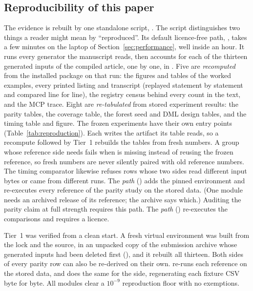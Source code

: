 \subsection{Reproducibility of this paper}\label{sec:reproducibility}

The evidence is rebuilt by one standalone script,
. The script distinguishes two
things a reader might mean by ``reproduced''. Its default licence-free
path, , takes a few minutes on the laptop of
Section~\ref{sec:performance}, well inside an hour. It
runs every generator the manuscript reads, then accounts for each of the
thirteen generated inputs of the compiled article, one by one, in
.
Five are \emph{recomputed} from the installed package on that run: the
figures and tables of the worked examples, every printed listing and
transcript (replayed statement by statement and compared line for line),
the registry census behind every count in the text, and the MCP trace.
Eight are \emph{re-tabulated} from stored experiment results: the parity
tables, the coverage table, the forest seed and DML design tables, and the
timing table and figure. The frozen
experiments have their own entry points (Table~\ref{tab:reproduction}).
Each writes the artifact its table reads, so a recompute followed by
Tier~1 rebuilds the tables from fresh numbers. A group whose reference
side needs  fails when  is missing instead of
reusing the frozen reference, so fresh  numbers are
never silently paired with old reference numbers. The timing comparator
likewise refuses rows whose two sides read different input bytes or
came from different runs. The \emph{ path} ()
adds the pinned  environment and re-executes every
 reference of the parity study on the stored data. (One module needs an archived release of its reference; the archive says which.) Auditing
the parity claim at full strength requires this path. The \emph{ path} () re-executes the
 comparisons and requires a  licence.

Tier~1 was verified from a clean start. A fresh virtual environment was
built from the lock and the  source, in an unpacked
copy of the submission archive whose generated inputs had been deleted first
(), and it rebuilt all thirteen. Both sides of every parity row
can also be re-derived on their own.
 re-runs each  reference
on the stored data, and  does the
same for the \statspai{} side, regenerating each fixture CSV byte for byte. All
\RParityModuleCount{} modules clear a \(10^{-9}\) reproduction floor with no
exemptions.

